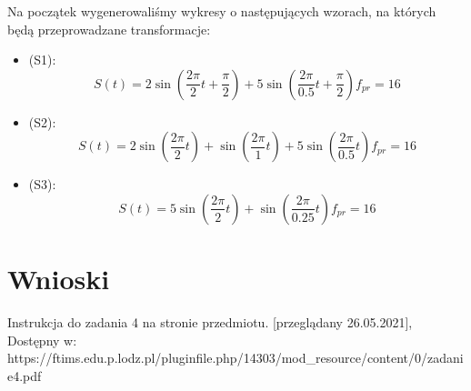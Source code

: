 \documentclass[12pt]{article}
\begin{document}
Na początek wygenerowaliśmy wykresy o następujących wzorach, na których będą przeprowadzane transformacje:
\begin{itemize}
    \item (S1):
    \begin{equation}
        S(t) = 2 \sin (\frac{2 \pi}{2}t + \frac{\pi}{2}) + 5 \sin (\frac{2 \pi}{0.5}t + \frac{\pi}{2})f_{pr} = 16
    \end{equation}
    \item (S2):
    \begin{equation}
        S(t) = 2 \sin (\frac{2 \pi}{2}t) + \sin (\frac{2 \pi}{1}t)+5 \sin (\frac{2\pi}{0.5}t) f_{pr} = 16
    \end{equation}
    \item (S3):
    \begin{equation}
        S(t) = 5 \sin (\frac{2 \pi}{2}t) + \sin (\frac{2 \pi}{0.25}t)f_{pr} = 16
    \end{equation}
\end{itemize}



\section{Wnioski}

\begin{thebibliography}{}
 Instrukcja do zadania 4 na stronie przedmiotu. [przeglądany 26.05.2021], Dostępny w: https://ftims.edu.p.lodz.pl/pluginfile.php/14303/mod\_resource/content/0/zadanie4.pdf


\end{thebibliography}
\end{document}
